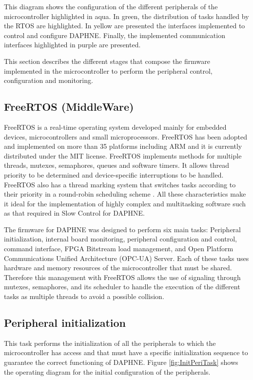 This diagram shows the configuration of the different peripherals of the microcontroller highlighted in aqua. In green, the distribution of tasks handled by the RTOS are highlighted. In yellow are presented the interfaces implemented to control and configure DAPHNE. Finally, the implemented communication interfaces highlighted in purple are presented.

This section describes the different stages that compose the firmware implemented in the microcontroller to perform the peripheral control, configuration and monitoring. 


\subsection{FreeRTOS (MiddleWare)}

FreeRTOS is a real-time operating system developed mainly for embedded devices, microcontrollers and small microprocessors. FreeRTOS has been adopted and implemented on more than 35 platforms including ARM and it is currently distributed under the MIT license. FreeRTOS implements methods for multiple threads, mutexes, semaphores, queues and software timers. It allows thread priority to be determined and device-specific interruptions to be handled. FreeRTOS also has a thread marking system that switches tasks according to their priority in a round-robin scheduling scheme \cite{freertos}. All these characteristics make it ideal for the implementation of highly complex and multitasking software such as that required in Slow Control for DAPHNE.


The firmware for DAPHNE was designed to perform six main tasks: Peripheral initialization, internal board monitoring, peripheral configuration and control, command interface, FPGA Bitstream load management, and Open Platform Communications Unified Architecture (OPC-UA) Server. Each of these tasks uses hardware and memory resources of the microcontroller that must be shared. Therefore this management with FreeRTOS allows the use of signaling through mutexes, semaphores, and its scheduler to handle the execution of the different tasks as multiple threads to avoid a possible collision.


\subsection{Peripheral initialization}

This task performs the initialization of all the peripherals to which the microcontroller has access and that must have a specific initialization sequence to guarantee the correct functioning of DAPHNE. Figure \ref{fig:InitPeriTask} shows the operating diagram for the initial configuration of the peripherals.

